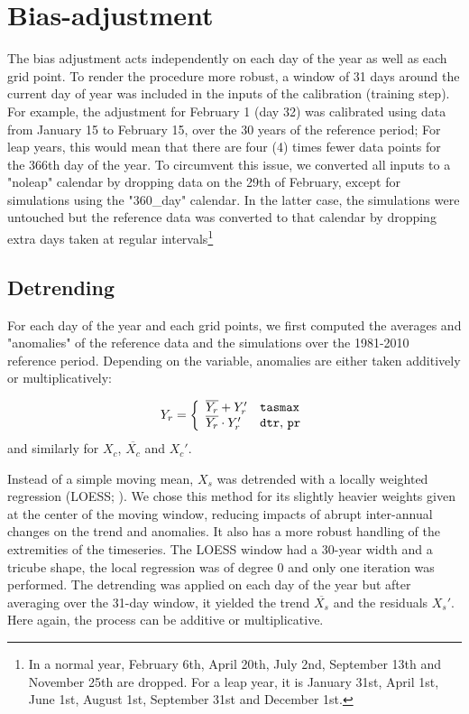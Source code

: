 \documentclass[letterpaper,10pt]{article}
\begin{document}
\section{Bias-adjustment}
The bias adjustment acts independently on each day of the year as well as each grid point.
To render the procedure more robust, a window of 31 days around the current day of year was included in the inputs of the calibration (training step).
For example, the adjustment for February 1 (day 32) was calibrated using data from January 15 to February 15, over the 30 years of the reference period;
For leap years, this would mean that there are four (4) times fewer data points for the 366th day of the year.
To circumvent this issue, we converted all inputs to a "noleap" calendar by dropping data on the 29th of February, except for simulations using the "360\_day" calendar.
In the latter case, the simulations were untouched but the reference data was converted to that calendar by dropping extra days taken at regular intervals\footnote{In a normal year, February 6th, April 20th, July 2nd, September 13th and November 25th are dropped. For a leap year, it is January 31st, April 1st, June 1st, August 1st, September 31st and December 1st.}

\subsection{Detrending}
For each day of the year and each grid points, we first computed the averages and "anomalies" of the reference data and the simulations over the 1981-2010 reference period.
Depending on the variable, anomalies are either taken additively or multiplicatively:

\begin{align}
Y_r = \left\{ \begin{array}{ll} \overline{Y_r} + Y_r' & \text{\texttt{tasmax}} \\ \overline{Y_r}\cdot Y_r' & \text{\texttt{dtr}, \texttt{pr}} \end{array}\right.
\end{align}
and similarly for $X_c$, $\overline{X_c}$ and $X_c'$.

Instead of a simple moving mean, $X_s$ was detrended with a locally weighted regression (LOESS; \cite{Cleveland79}).
We chose this method for its slightly heavier weights given at the center of the moving window, reducing impacts of abrupt inter-annual changes on the trend and anomalies.
It also has a more robust handling of the extremities of the timeseries.
The LOESS window had a 30-year width and a tricube shape, the local regression was of degree 0 and only one iteration was performed.
The detrending was applied on each day of the year but after averaging over the 31-day window, it yielded the trend $\overline{X_s}$ and the residuals $X_s'$.
Here again, the process can be additive or multiplicative.
\end{document}
